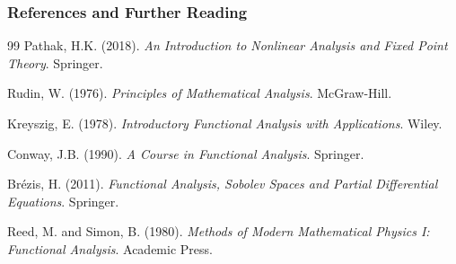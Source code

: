 \documentclass[aspectratio=169,10pt]{beamer}
\begin{document}
\begin{frame}
\frametitle{References and Further Reading}

\begin{thebibliography}{99}
Pathak, H.K. (2018). \textit{An Introduction to Nonlinear Analysis and Fixed Point Theory}. Springer.

Rudin, W. (1976). \textit{Principles of Mathematical Analysis}. McGraw-Hill.

Kreyszig, E. (1978). \textit{Introductory Functional Analysis with Applications}. Wiley.

Conway, J.B. (1990). \textit{A Course in Functional Analysis}. Springer.

Brézis, H. (2011). \textit{Functional Analysis, Sobolev Spaces and Partial Differential Equations}. Springer.

Reed, M. and Simon, B. (1980). \textit{Methods of Modern Mathematical Physics I: Functional Analysis}. Academic Press.
\end{thebibliography}
\end{frame}
\end{document}
